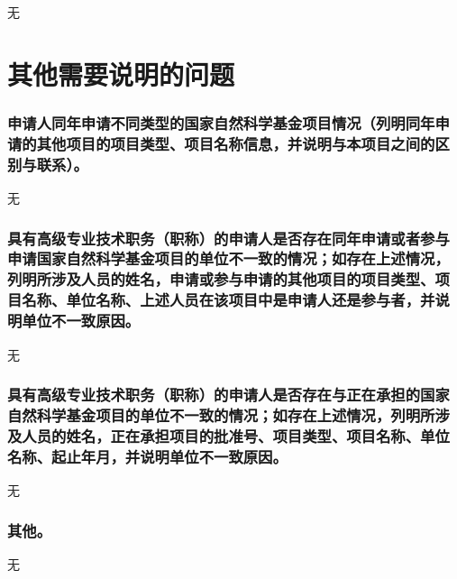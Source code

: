 \documentclass{article}
\begin{document}
无

\part{\textbf{其他需要说明的问题}}

\section{申请人同年申请不同类型的国家自然科学基金项目情况（列明同年申请的其他项目的项目类型、项目名称信息，并说明与本项目之间的区别与联系）。}

无

\section{具有高级专业技术职务（职称）的申请人是否存在同年申请或者参与申请国家自然科学基金项目的单位不一致的情况；如存在上述情况，列明所涉及人员的姓名，申请或参与申请的其他项目的项目类型、项目名称、单位名称、上述人员在该项目中是申请人还是参与者，并说明单位不一致原因。}

无

\section{具有高级专业技术职务（职称）的申请人是否存在与正在承担的国家自然科学基金项目的单位不一致的情况；如存在上述情况，列明所涉及人员的姓名，正在承担项目的批准号、项目类型、项目名称、单位名称、起止年月，并说明单位不一致原因。}

无

\section{其他。}

无
\end{document}
